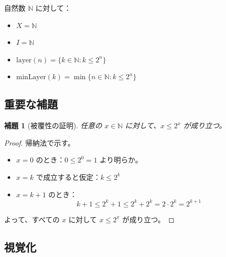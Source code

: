 \documentclass[a4paper,11pt]{ltjsarticle}
\newtheorem{lemma}[theorem]{補題}
\begin{document}
自然数 $\mathbb{N}$ に対して：

\begin{itemize}
\item $X = \mathbb{N}$
\item $I = \mathbb{N}$
\item $\text{layer}(n) = \{k \in \mathbb{N} : k \leq 2^n\}$
\item $\text{minLayer}(k) = \min\{n \in \mathbb{N} : k \leq 2^n\}$
\end{itemize}

\subsection{重要な補題}

\begin{lemma}[被覆性の証明]
任意の $x \in \mathbb{N}$ に対して、$x \leq 2^x$ が成り立つ。
\end{lemma}

\begin{proof}
帰納法で示す。
\begin{itemize}
\item $x = 0$ のとき：$0 \leq 2^0 = 1$ より明らか。
\item $x = k$ で成立すると仮定：$k \leq 2^k$
\item $x = k+1$ のとき：
\[
k + 1 \leq 2^k + 1 \leq 2^k + 2^k = 2 \cdot 2^k = 2^{k+1}
\]
\end{itemize}
よって、すべての $x$ に対して $x \leq 2^x$ が成り立つ。
\end{proof}

\subsection{視覚化}

\begin{center}
\end{center}
\end{document}
